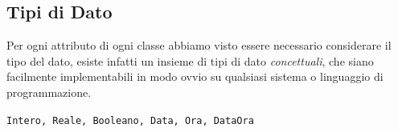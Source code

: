 \documentclass[12pt, letterpaper]{article}
\newcommand{\code}[1]{\colorbox{light-gray}{\texttt{#1}}}
\begin{document}
\subsection{Tipi di Dato} 
Per ogni attributo di ogni classe abbiamo visto essere necessario 
considerare il tipo del dato, esiste infatti un insieme di tipi di 
dato \textit{concettuali}, che siano facilmente implementabili 
in modo ovvio su qualsiasi sistema o linguaggio di programmazione.\begin{center}
    \code{Intero, Reale, Booleano, Data, Ora, DataOra}
\end{center}
\end{document}
